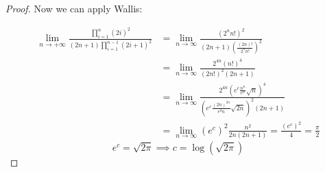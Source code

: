 \documentclass[12pt,a4paper]{report}
\numberwithin{equation}{section}
\theoremstyle{definition}
\theoremstyle{remark}
\begin{document}
\begin{proof}
Now we can apply Wallis:

\begin{align*}
\lim_{n\rightarrow +\infty} \frac{\displaystyle\prod_{i=1}^{n} (2i)^2}{(2n+1)\displaystyle \prod _{i=1}^{n-1} (2i+1)^2}  &= \lim_{n\rightarrow \infty} \frac{(2^n n!)^2}{(2n+1) \left( \frac{(2n)!}{2^n n!}\right)^2}\\
&=\lim_{n\rightarrow \infty} \frac{2^{4n} (n!)^4}{(2n!)^2 (2n+1)} \\
&=\lim_{n\rightarrow \infty} \frac{2^{4n} \left( e^c \frac{n^n}{e^n} \sqrt{n} \right)^4}{\left( e^c \frac{(2n)^{2n}}{e^2n} \sqrt{2n} \right)^2 (2n+1)}\\
&=\lim_{n\rightarrow \infty} (e^c)^2 \frac{n^2}{2n(2n+1)} = \frac{(e^c)^2}{4}
= \frac{\pi}{2} 
\end{align*}
\begin{equation}
e^c = \sqrt{2\pi} \implies c = \log(\sqrt{2\pi})
\end{equation}

\end{proof}

\tableofcontents
\end{document}
